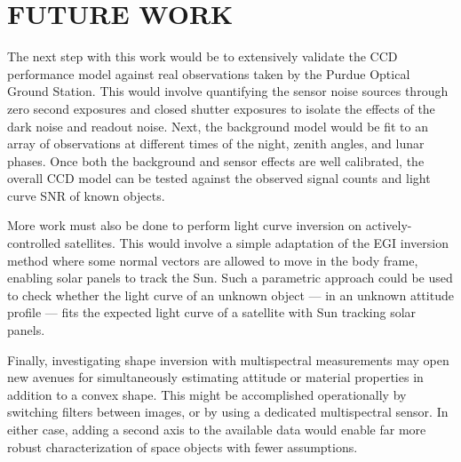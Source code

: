 
\chapter{FUTURE WORK}

The next step with this work would be to extensively validate the CCD performance model against real observations taken by the Purdue Optical Ground Station. This would involve quantifying the sensor noise sources through zero second exposures and closed shutter exposures to isolate the effects of the dark noise and readout noise. Next, the background model would be fit to an array of observations at different times of the night, zenith angles, and lunar phases. Once both the background and sensor effects are well calibrated, the overall CCD model can be tested against the observed signal counts and light curve SNR of known objects.

More work must also be done to perform light curve inversion on actively-controlled satellites. This would involve a simple adaptation of the EGI inversion method where some normal vectors are allowed to move in the body frame, enabling solar panels to track the Sun. Such a parametric approach could be used to check whether the light curve of an unknown object --- in an unknown attitude profile --- fits the expected light curve of a satellite with Sun tracking solar panels. 

Finally, investigating shape inversion with multispectral measurements may open new avenues for simultaneously estimating attitude or material properties in addition to a convex shape. This might be accomplished operationally by switching filters between images, or by using a dedicated multispectral sensor. In either case, adding a second axis to the available data would enable far more robust characterization of space objects with fewer assumptions.